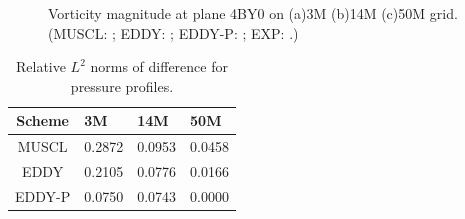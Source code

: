 \begin{figure}[t]
     \caption{Vorticity magnitude at plane 4BY0 on (a)3M (b)14M (c)50M grid. (MUSCL: \mline; EDDY: \eline; EDDY-P: \epline; EXP: \exact.)}
     \label{vo} 
\end{figure}
\begin{table}[t]
\caption{Relative $L^{2}$ norms of difference for pressure profiles.}
\begin{center}
\label{table2}
\begin{tabular}{c l l l}
\hline
Scheme & 3M     & 14M    & 50M    \\ 
\hline
MUSCL  & 0.2872 & 0.0953 & 0.0458 \\ 
EDDY   & 0.2105 & 0.0776 & 0.0166 \\ 
EDDY-P & 0.0750 & 0.0743 & 0.0000 \\
\hline 
\end{tabular}
\end{center}
\end{table}












































